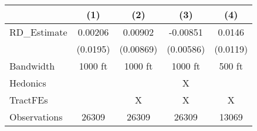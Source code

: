 {
\def\sym#1{\ifmmode^{#1}\else\(^{#1}\)\fi}
\begin{tabular}{l*{4}{c}}
\toprule
                    &\multicolumn{1}{c}{(1)}   &\multicolumn{1}{c}{(2)}   &\multicolumn{1}{c}{(3)}   &\multicolumn{1}{c}{(4)}   \\
\midrule
RD\_Estimate         &     0.00206   &     0.00902   &    -0.00851   &      0.0146   \\
                    &    (0.0195)   &   (0.00869)   &   (0.00586)   &    (0.0119)   \\
\midrule
Bandwidth           &     1000 ft   &     1000 ft   &     1000 ft   &      500 ft   \\
Hedonics            &               &               &           X   &               \\
TractFEs            &               &           X   &           X   &           X   \\
Observations        &       26309   &       26309   &       26309   &       13069   \\
\bottomrule
\end{tabular}
}
